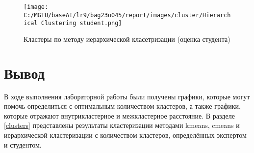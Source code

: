 \begin{figure}[H]
    \centering
    \texttt{[image: C:/MGTU/baseAI/lr9/bag23u045/report/images/cluster/Hierarchical Clustering student.png]}
    \caption{Кластеры по методу иерархической класетризации (оценка студента)}
\end{figure}

\section{Вывод}

В ходе выполнения лабораторной работы были получены графики, которые могут помочь определиться с оптимальным количеством кластеров,
а также графики, которые отражают внутрикластерное и межкластерное расстояние.
В разделе \ref{clusters} представлены результаты кластеризации методами kmeans, cmeans и иерархической кластеризации 
с количеством кластеров, определённых экспертом и студентом.

\clearpage